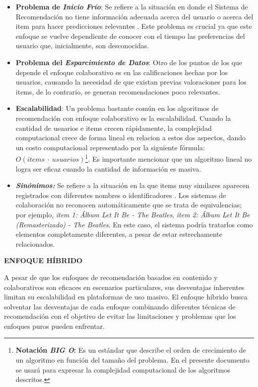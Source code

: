 \begin{itemize}
    \item \textbf{Problema de \textit{Inicio Frío}}: Se refiere a la situación en donde el Sistema de Recomendación no tiene información adecuada acerca del usuario o acerca del item para hacer predicciones relevantes \parencite{Burke2007}. Este problema es crucial ya que este enfoque se vuelve dependiente de conocer con el tiempo las preferencias del usuario que, inicialmente, son desconocidas.

    \item \textbf{Problema del \textit{Esparcimiento de Datos}}: Otro de los puntos de los que depende el enfoque colaborativo es en las calificaciones hechas por los usuarios, causando la necesidad de que existan previas valoraciones para los items, de lo contrario, se generan recomendaciones poco relevantes.
    
    \item \textbf{Escalabilidad}: Un problema bastante común en los algoritmos de recomendación con enfoque colaborativo es la escalabilidad. Cuando la cantidad de usuarios e items crecen rápidamente, la complejidad computacional crece de forma lineal en relacion a estos dos aspectos, dando un costo computacional representado por la siguiente fórmula: $O(items \ \cdot \ usuarios)$\footnote{\textbf{Notación \textit{BIG O}:}  Es un estándar que describe el orden de crecimiento de un algoritmo en función del tamaño del problema. En el presente documento se usará para expresar la complejidad computacional de los algoritmos descritos.}. Es importante mencionar que un algoritmo lineal no logra ser eficaz cuando la cantidad de información es masiva.

    \newpage

    \item \textbf{\textit{Sinónimos: }} Se refiere a la situación en la que items muy similares aparecen registrados con diferentes nombres o identificadores \parencite{ISINKAYE2015261}. Los sistemas de colaboración no reconocen automáticamente que se trata de equivalencias; por ejemplo, \textit{item 1: Álbum Let It Be - The Beatles}, \textit{item 2: Álbum Let It Be (Remasterizado) - The Beatles}. En este caso, el sistema podría tratarlos como elementos completamente diferentes, a pesar de estar estrechamente relacionados.
\end{itemize}

\textbf{ENFOQUE HÍBRIDO}

A pesar de que los enfoques de recomendación basados en contenido y colaborativos son eficaces en escenarios particulares, sus desventajas inherentes limitan su escalabilidad en plataformas de uso masivo.  El enfoque híbrido busca solventar las desventajas de cada enfoque combinando diferentes técnicas de recomendación con el objetivo de evitar las limitaciones y problemas que los enfoques puros pueden enfrentar.

